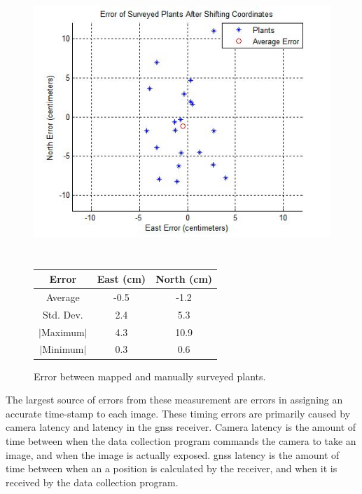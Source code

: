   \begin{figure}
	\centering
    \includegraphics[height=4in]{figures/plant_errors.jpg}
    \label{figure:plant_errors}
    \newline
    \newline
    \centering
    \begin{tabular}[c]{|c|c|c|}
        \hline
        Error & East (cm) & North (cm) \\ 
        \hline
        Average   & -0.5 & -1.2           \\
        Std. Dev. & 2.4 & 5.3       \\
        $|$Maximum$|$   & 4.3 & 10.9       \\
        $|$Minimum$|$   & 0.3 & 0.6       \\
        \hline
    \end{tabular}
    \captionsetup{labelformat=andtable}
    \caption{Error between mapped and manually surveyed plants.}
  \end{figure}

The largest source of errors from these measurement are errors in assigning an accurate time-stamp to each image.  These timing errors are primarily caused by camera latency and latency in the \ac{gnss} receiver.  Camera latency is the amount of time between when the data collection program commands the camera to take an image, and when the image is actually exposed.  \ac{gnss} latency is the amount of time between when an a position is calculated by the receiver, and when it is received by the data collection program. 

